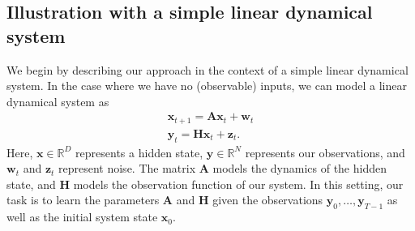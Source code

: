 \documentclass{article}
\newcommand{\vct}[1]{\boldsymbol{#1}}
\newcommand{\vx}{\vct{x}}
\newcommand{\vy}{\vct{y}}
\newcommand{\vw}{\vct{w}}
\newcommand{\vz}{\vct{z}}
\newcommand{\mtx}[1]{\boldsymbol{#1}}
\newcommand{\mA}{\mtx{A}}
\newcommand{\mH}{\mtx{H}}
\begin{document}
\subsection{Illustration with a simple linear dynamical system}

We begin by describing our approach in the context of a simple linear dynamical system. In the case where we have no (observable) inputs, we can model a linear dynamical system as
\begin{align*}
    \vx_{t+1} = \mA \vx_t + \vw_t \\
    \vy_{t} = \mH \vx_t + \vz_t.
\end{align*}
Here, $\vx \in \mathbb{R}^D$ represents a hidden state, $\vy \in \mathbb{R}^N$ represents our observations, and $\vw_t$ and $\vz_t$ represent noise. The matrix $\mA$ models the dynamics of the hidden state, and $\mH$ models the observation function of our system. In this setting, our task is to learn the parameters $\mA$ and $\mH$ given the observations $\vy_0, \ldots, \vy_{T-1}$ as well as the initial system state $\vx_0$.
\end{document}
